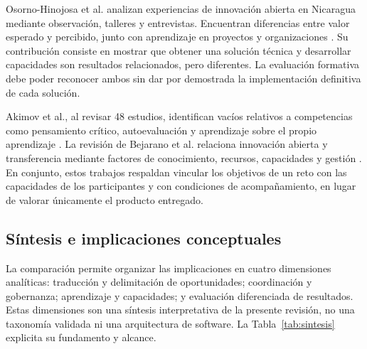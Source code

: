 \documentclass[12pt,twocolumn]{article}
\begin{document}
Osorno-Hinojosa et al. analizan experiencias de innovación abierta en Nicaragua mediante observación, talleres y entrevistas. Encuentran diferencias entre valor esperado y percibido, junto con aprendizaje en proyectos y organizaciones \cite{osorno2022}. Su contribución consiste en mostrar que obtener una solución técnica y desarrollar capacidades son resultados relacionados, pero diferentes. La evaluación formativa debe poder reconocer ambos sin dar por demostrada la implementación definitiva de cada solución.

Akimov et al., al revisar 48 estudios, identifican vacíos relativos a competencias como pensamiento crítico, autoevaluación y aprendizaje sobre el propio aprendizaje \cite{akimov2023}. La revisión de Bejarano et al. relaciona innovación abierta y transferencia mediante factores de conocimiento, recursos, capacidades y gestión \cite{bejarano2023}. En conjunto, estos trabajos respaldan vincular los objetivos de un reto con las capacidades de los participantes y con condiciones de acompañamiento, en lugar de valorar únicamente el producto entregado.

\subsection{Síntesis e implicaciones conceptuales}
La comparación permite organizar las implicaciones en cuatro dimensiones analíticas: traducción y delimitación de oportunidades; coordinación y gobernanza; aprendizaje y capacidades; y evaluación diferenciada de resultados. Estas dimensiones son una síntesis interpretativa de la presente revisión, no una taxonomía validada ni una arquitectura de software. La Tabla~\ref{tab:sintesis} explicita su fundamento y alcance.
\end{document}
